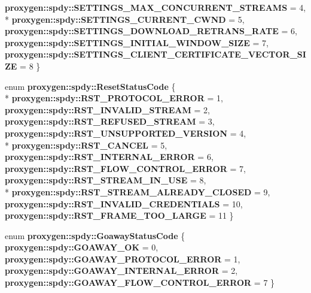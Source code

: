 \begin{DoxyCompactItemize}
{\bf proxygen\+::spdy\+::\+S\+E\+T\+T\+I\+N\+G\+S\+\_\+\+M\+A\+X\+\_\+\+C\+O\+N\+C\+U\+R\+R\+E\+N\+T\+\_\+\+S\+T\+R\+E\+A\+MS} = 4, 
\\*
{\bf proxygen\+::spdy\+::\+S\+E\+T\+T\+I\+N\+G\+S\+\_\+\+C\+U\+R\+R\+E\+N\+T\+\_\+\+C\+W\+ND} = 5, 
{\bf proxygen\+::spdy\+::\+S\+E\+T\+T\+I\+N\+G\+S\+\_\+\+D\+O\+W\+N\+L\+O\+A\+D\+\_\+\+R\+E\+T\+R\+A\+N\+S\+\_\+\+R\+A\+TE} = 6, 
{\bf proxygen\+::spdy\+::\+S\+E\+T\+T\+I\+N\+G\+S\+\_\+\+I\+N\+I\+T\+I\+A\+L\+\_\+\+W\+I\+N\+D\+O\+W\+\_\+\+S\+I\+ZE} = 7, 
{\bf proxygen\+::spdy\+::\+S\+E\+T\+T\+I\+N\+G\+S\+\_\+\+C\+L\+I\+E\+N\+T\+\_\+\+C\+E\+R\+T\+I\+F\+I\+C\+A\+T\+E\+\_\+\+V\+E\+C\+T\+O\+R\+\_\+\+S\+I\+ZE} = 8
 \}
\item 
enum {\bf proxygen\+::spdy\+::\+Reset\+Status\+Code} \{ \\*
{\bf proxygen\+::spdy\+::\+R\+S\+T\+\_\+\+P\+R\+O\+T\+O\+C\+O\+L\+\_\+\+E\+R\+R\+OR} = 1, 
{\bf proxygen\+::spdy\+::\+R\+S\+T\+\_\+\+I\+N\+V\+A\+L\+I\+D\+\_\+\+S\+T\+R\+E\+AM} = 2, 
{\bf proxygen\+::spdy\+::\+R\+S\+T\+\_\+\+R\+E\+F\+U\+S\+E\+D\+\_\+\+S\+T\+R\+E\+AM} = 3, 
{\bf proxygen\+::spdy\+::\+R\+S\+T\+\_\+\+U\+N\+S\+U\+P\+P\+O\+R\+T\+E\+D\+\_\+\+V\+E\+R\+S\+I\+ON} = 4, 
\\*
{\bf proxygen\+::spdy\+::\+R\+S\+T\+\_\+\+C\+A\+N\+C\+EL} = 5, 
{\bf proxygen\+::spdy\+::\+R\+S\+T\+\_\+\+I\+N\+T\+E\+R\+N\+A\+L\+\_\+\+E\+R\+R\+OR} = 6, 
{\bf proxygen\+::spdy\+::\+R\+S\+T\+\_\+\+F\+L\+O\+W\+\_\+\+C\+O\+N\+T\+R\+O\+L\+\_\+\+E\+R\+R\+OR} = 7, 
{\bf proxygen\+::spdy\+::\+R\+S\+T\+\_\+\+S\+T\+R\+E\+A\+M\+\_\+\+I\+N\+\_\+\+U\+SE} = 8, 
\\*
{\bf proxygen\+::spdy\+::\+R\+S\+T\+\_\+\+S\+T\+R\+E\+A\+M\+\_\+\+A\+L\+R\+E\+A\+D\+Y\+\_\+\+C\+L\+O\+S\+ED} = 9, 
{\bf proxygen\+::spdy\+::\+R\+S\+T\+\_\+\+I\+N\+V\+A\+L\+I\+D\+\_\+\+C\+R\+E\+D\+E\+N\+T\+I\+A\+LS} = 10, 
{\bf proxygen\+::spdy\+::\+R\+S\+T\+\_\+\+F\+R\+A\+M\+E\+\_\+\+T\+O\+O\+\_\+\+L\+A\+R\+GE} = 11
 \}
\item 
enum {\bf proxygen\+::spdy\+::\+Goaway\+Status\+Code} \{ {\bf proxygen\+::spdy\+::\+G\+O\+A\+W\+A\+Y\+\_\+\+OK} = 0, 
{\bf proxygen\+::spdy\+::\+G\+O\+A\+W\+A\+Y\+\_\+\+P\+R\+O\+T\+O\+C\+O\+L\+\_\+\+E\+R\+R\+OR} = 1, 
{\bf proxygen\+::spdy\+::\+G\+O\+A\+W\+A\+Y\+\_\+\+I\+N\+T\+E\+R\+N\+A\+L\+\_\+\+E\+R\+R\+OR} = 2, 
{\bf proxygen\+::spdy\+::\+G\+O\+A\+W\+A\+Y\+\_\+\+F\+L\+O\+W\+\_\+\+C\+O\+N\+T\+R\+O\+L\+\_\+\+E\+R\+R\+OR} = 7
 \}
\end{DoxyCompactItemize}
